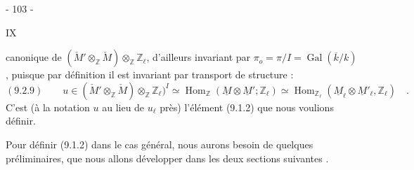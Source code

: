


\begin{center}- 103 -\end{center}\hfill IX

canonique de $(\check M'\otimes_{\mathbb Z}\check M)\otimes_{\mathbb Z}\mathbb Z_\ell$, d'ailleurs invariant par $\pi_o=\pi/I=\operatorname{Gal}(\overline k/k)$, puisque par définition il est invariant par transport de structure :
\[
(9.2.9)\qquad u\in(\check M'\otimes_{\mathbb Z}\check M)\otimes_{\mathbb Z}\mathbb Z_\ell)^I
\simeq\operatorname{Hom}_{\mathbb Z}(\underline M\otimes\underline M';\mathbb Z_\ell)
\simeq\operatorname{Hom}_{\mathbb Z_\ell}(\underline M_\ell\otimes\underline M'_\ell,\mathbb Z_\ell)\quad.
\]
C'est (à la notation $u$ au lieu de $u_\ell$ près) l'élément (9.1.2) que nous voulions définir.

Pour définir (9.1.2) dans le cas général, nous aurons besoin de quelques préliminaires, que nous allons développer dans les deux sections suivantes .

